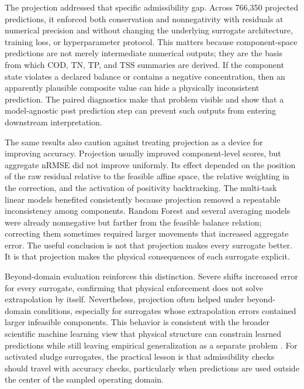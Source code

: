 \documentclass[12pt, twoside]{book}
\begin{document}
The projection addressed that specific admissibility gap. Across 766,350 projected predictions, it enforced
both conservation and nonnegativity with residuals at numerical precision and without changing the underlying
surrogate architecture, training loss, or hyperparameter protocol. This matters because component-space
predictions are not merely intermediate numerical outputs; they are the basis from which COD, TN, TP, and TSS
summaries are derived. If the component state violates a declared balance or contains a negative concentration,
then an apparently plausible composite value can hide a physically inconsistent prediction. The paired
diagnostics make that problem visible and show that a model-agnostic post prediction step can prevent such
outputs from entering downstream interpretation.

The same results also caution against treating projection as a device for improving accuracy. Projection
usually improved component-level scores, but aggregate nRMSE did not improve uniformly. Its effect depended on
the position of the raw residual relative to the feasible affine space, the relative weighting in the
correction, and the activation of positivity backtracking. The multi-task linear models benefited consistently
because projection removed a repeatable inconsistency among components. Random Forest and several averaging
models were already nonnegative but farther from the feasible balance relation; correcting them sometimes
required larger movements that increased aggregate error. The useful conclusion is not that projection makes
every surrogate better. It is that projection makes the physical consequences of each surrogate explicit.

Beyond-domain evaluation reinforces this distinction. Severe shifts increased error for every surrogate,
confirming that physical enforcement does not solve extrapolation by itself. Nevertheless, projection often
helped under beyond-domain conditions, especially for surrogates whose extrapolation errors contained larger
infeasible components. This behavior is consistent with the broader scientific machine learning view that
physical structure can constrain learned predictions while still leaving empirical generalization as a
separate problem \citep{Hansen2024,Shen2023,Valente2025}. For activated sludge surrogates, the practical
lesson is that admissibility checks should travel with accuracy checks, particularly when predictions are used
outside the center of the sampled operating domain.
\end{document}
